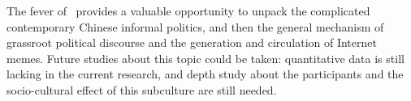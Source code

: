 The fever of \moha\ provides a valuable opportunity to unpack the complicated contemporary Chinese informal politics, and then the general mechanism of grassroot political discourse and the generation and circulation of Internet memes. Future studies about this topic could be taken: quantitative data is still lacking in the current research, and depth study about the participants and the socio-cultural effect of this subculture are still needed.




